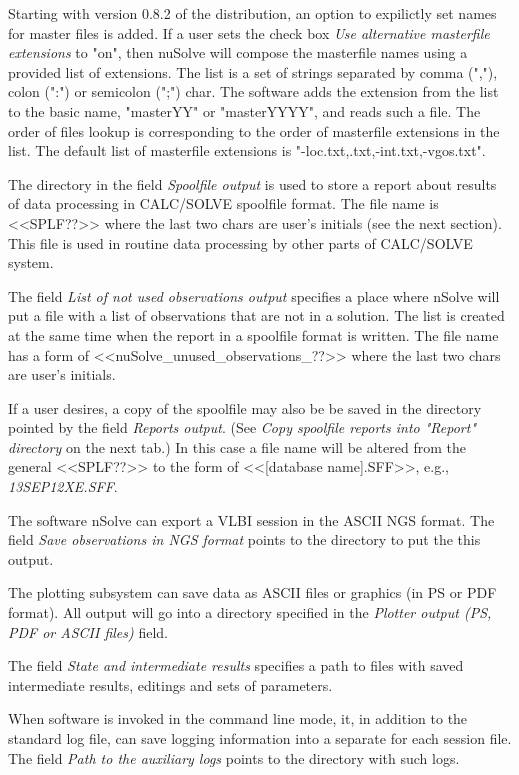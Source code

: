 \documentclass [10pt,letterpaper]{report}
\newcommand{\nuSolve}{\greektext n\latintext Solve}
\begin{document}
{Starting with version 0.8.2 of the distribution, an option to expilictly set names
for master files is added. If a user sets the check box {\sl Use alternative
masterfile extensions} to "on", then nuSolve will compose the masterfile names
using a provided list of extensions. The list is a set of strings separated by
comma (","), colon (":") or semicolon (";") char. The software adds the extension
from the list to the basic name, "masterYY" or "masterYYYY", and reads such a file.
The order of files lookup is corresponding to the order of masterfile
extensions in the list. The default list of masterfile extensions is
"-loc.txt,.txt,-int.txt,-vgos.txt".


The directory in the field {\sl Spoolfile output} is used to store a
report about results of data processing in CALC/SOLVE spoolfile format.
The file name is <<SPLF??>> where the last two chars are user's initials
(see the next section). This file is used in routine data processing
by other parts of CALC/SOLVE system.

The field {\sl List of not used observations output} specifies a place
where \nuSolve{} will put a file with a list of observations that are not
in a solution. The list is created at the same time when the report in a
spoolfile format is written. The file name has a form of
<<nuSolve\_unused\_observations\_??>> where the last two chars are user's
initials.

If a user desires, a copy of the spoolfile may also be be saved in the
directory pointed by the field {\sl Reports output}. (See {\sl Copy
spoolfile reports into "Report" directory} on the next tab.) In this case a file
name will be altered from the general <<SPLF??>> to the form of
<<[database name].SFF>>, e.g., {\sl 13SEP12XE.SFF}.

The software \nuSolve{} can export a VLBI session in the ASCII NGS
format. The field {\sl Save observations in NGS format} points to the
directory to put the this output.

The plotting subsystem can save data as ASCII files or graphics (in PS
or PDF format). All output will go into a directory specified in the
{\sl Plotter output (PS, PDF or ASCII files)} field.

The field {\sl State and intermediate results} specifies a path to
files with saved intermediate results, editings and sets of parameters.

When software is invoked in the command line mode, it, in addition to
the standard log file, can save logging information into a separate
for each session file. The field {\sl Path to the auxiliary logs}
points to the directory with such logs.



}
\end{document}
